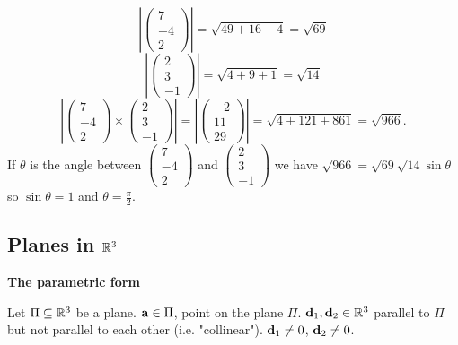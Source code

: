 \documentclass[10pt, a4paper]{article}
\begin{document}
\begin{example}
    \[
    \left|\begin{pmatrix}
        7 \\ -4 \\ 2   
    \end{pmatrix}\right| = \sqrt{49 + 16 + 4} = \sqrt{69}
    \]
    \[
    \left|\begin{pmatrix}
        2 \\ 3 \\ -1
    \end{pmatrix}\right| = \sqrt{4 + 9 + 1} = \sqrt{14}
    \]
    \[
    \left|\begin{pmatrix}
        7 \\ -4 \\ 2   
    \end{pmatrix}
    \times
    \begin{pmatrix}
        2 \\ 3 \\ -1
    \end{pmatrix}\right| = \left|\begin{pmatrix}
        -2 \\ 11 \\ 29
    \end{pmatrix}\right| = \sqrt{4 + 121 + 861} = \sqrt{966}.
    \]
    If $\theta$ is the angle between $\begin{pmatrix}
        7 \\ -4 \\ 2   
    \end{pmatrix}$ and $\begin{pmatrix}
        2 \\ 3 \\ -1
    \end{pmatrix}$ we have $\sqrt{966} = \sqrt{69}\sqrt{14}\sin\theta$ so $\sin\theta = 1$ and $\theta = \frac{\pi}{2}$.
\end{example}

\subsection{Planes in \texorpdfstring{$\mathbb{R} ^ 3$}{}}

\textbf{The parametric form}

Let $\Pi \subseteq \mathbb{R} ^ 3$ be a plane. $\mathbf{a} \in \Pi$, point on the plane $\Pi$. $\mathbf{d}_1, \mathbf{d}_2 \in \mathbb{R} ^ 3$ parallel to $\Pi$ but not parallel to each other (i.e. "collinear"). $\mathbf{d}_1 \neq 0$, $\mathbf{d}_2 \neq 0$.
\end{document}
